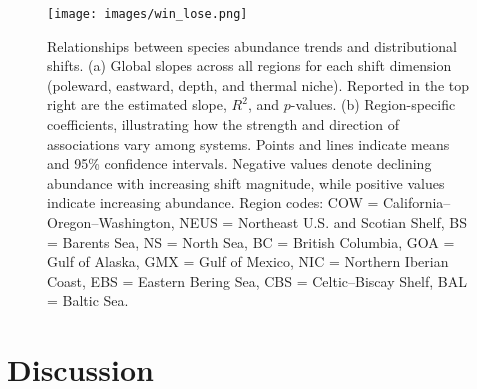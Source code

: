 \documentclass[11pt]{article}
\begin{document}
\begin{spacing}{1.5}
\begin{figure}[h]
    \centering
    \texttt{[image: images/win\_lose.png]}
    \caption{
 Relationships between species abundance trends and distributional shifts. (a) Global slopes across all regions for each shift dimension (poleward, eastward, depth, and thermal niche). Reported in the top right are the estimated slope, $R^2$, and $p$-values. (b) Region-specific coefficients, illustrating how the strength and direction of associations vary among systems. Points and lines indicate means and 95\% confidence intervals. Negative values denote declining abundance with increasing shift magnitude, while positive values indicate increasing abundance. Region codes: COW = California–Oregon–Washington, NEUS = Northeast U.S. and Scotian Shelf, BS = Barents Sea, NS = North Sea, BC = British Columbia, GOA = Gulf of Alaska, GMX = Gulf of Mexico, NIC = Northern Iberian Coast, EBS = Eastern Bering Sea, CBS = Celtic–Biscay Shelf, BAL = Baltic Sea.}
    \label{fig:win_lose}
\end{figure}


\section{Discussion}



\end{spacing}
\end{document}
